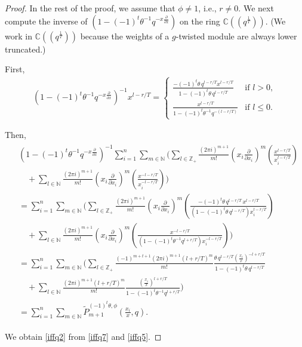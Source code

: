 \documentclass[9pt]{amsart}
\begin{document}
\begin{proof}
In the rest of the proof, we assume that \( \phi \neq 1 \), i.e., \( r \neq 0 \).  
We next compute the inverse of \( \left(1 - (-1)^{t} \theta^{-1} q^{-x\frac{\partial}{\partial x}} \right) \) on the ring \( \mathbb{C}((q^{\frac{1}{T}})) \).  
(We work in \( \mathbb{C}((q^{\frac{1}{T}})) \) because the weights of a \( g \)-twisted module are always lower truncated.)

 First, 
\begin{align}\label{iffq6}
  \left(1 - (-1)^{t} \theta^{-1} q^{-x\frac{\partial}{\partial x}} \right)^{-1} x^{l - r/T}
  =
  \begin{cases}
    \displaystyle\frac{-(-1)^{t} \theta\, q^{l - r/T} x^{l - r/T}}{1 - (-1)^{t} \theta\, q^{l - r/T}} & \text{if } l > 0,\\[1ex]
    \displaystyle\frac{x^{l - r/T}}{1 - (-1)^{t} \theta^{-1} q^{-(l - r/T)}} & \text{if } l \leq 0.
  \end{cases}
\end{align}

Then,
\begin{align}\label{iffq7}
\begin{split}
  &\left(1 - (-1)^t \theta^{-1} q^{-x\frac{\partial}{\partial x}}\right)^{-1}
  \sum_{i=1}^{n} \sum_{m \in \mathbb{N}} \Bigg(
    \sum_{l \in \mathbb{Z}_+}
    \frac{(2\pi i)^{m+1}}{m!}
    \left(x_i \frac{\partial}{\partial x_i}\right)^m
    \left(\frac{x^{l - r/T}}{x_i^{l - r/T}}\right) \\
  &\quad +
    \sum_{l \in \mathbb{N}}
    \frac{(2\pi i)^{m+1}}{m!}
    \left(x_i \frac{\partial}{\partial x_i}\right)^m
    \left(\frac{x^{-l - r/T}}{x_i^{-l - r/T}}\right)
  \Bigg)\\
  &=
  \sum_{i=1}^{n} \sum_{m \in \mathbb{N}} \Bigg(
    \sum_{l \in \mathbb{Z}_+}
    \frac{(2\pi i)^{m+1}}{m!}
    \left(x_i \frac{\partial}{\partial x_i}\right)^m
    \left(
      \frac{-(-1)^t \theta\, q^{l - r/T}\, x^{l - r/T}}{(1 - (-1)^t \theta\, q^{l - r/T}) x_i^{l - r/T}}
    \right)\\
  &\quad +
    \sum_{l \in \mathbb{N}}
    \frac{(2\pi i)^{m+1}}{m!}
    \left(x_i \frac{\partial}{\partial x_i}\right)^m
    \left(
      \frac{x^{-l - r/T}}{(1 - (-1)^t \theta^{-1} q^{l + r/T}) x_i^{-l - r/T}}
    \right)
  \Bigg)\\
  &=
  \sum_{i=1}^{n} \sum_{m \in \mathbb{N}} \Bigg(
    \sum_{l \in \mathbb{Z}_+}
    \frac{(-1)^{m + t + 1} (2\pi i)^{m+1} (l + r/T)^m}{m!}
    \frac{\theta\, q^{l - r/T} \left(\frac{x_i}{x}\right)^{-l + r/T}}{1 - (-1)^t \theta\, q^{l - r/T}}\\
  &\quad +
    \sum_{l \in \mathbb{N}}
    \frac{(2\pi i)^{m+1} (l + r/T)^m}{m!}
    \frac{\left(\frac{x_i}{x}\right)^{l + r/T}}{1 - (-1)^t \theta^{-1} q^{l + r/T}}
  \Bigg)\\
  &= \sum_{i=1}^{n} \sum_{m \in \mathbb{N}} \tilde{P}_{m+1}^{(-1)^t \theta, \phi}\left(\frac{x_i}{x}, q\right).
\end{split}
\end{align}

We obtain \eqref{iffq2} from \eqref{iffq7} and \eqref{iffq5}.

\end{proof}
\end{document}
